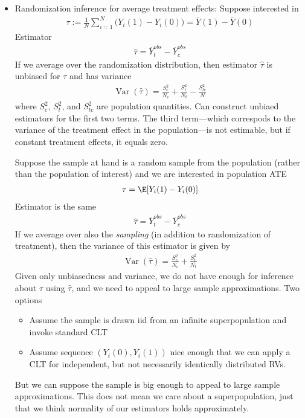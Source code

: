 \documentclass[12pt]{article}
\theoremstyle{plain}
\theoremstyle{definition}
\theoremstyle{remark}
\newcommand{\Var}{\operatorname{Var}}
\newcommand{\sumiN}{\sum^N_{i=1}}
\begin{document}
\begin{itemize}
  \item
    Randomization inference for average treatment effects:
    Suppose interested in
    \begin{align*}
      \tau
      :=
      \frac{1}{N}
      \sumiN
      \big(
      Y_i(1)-Y_i(0)
      \big)
      =
      \overline{Y}(1)
      -
      \overline{Y}(0)
    \end{align*}
    Estimator
    \begin{align*}
      \hat{\tau}
      =
      \overline{Y}_t^{obs}
      -
      \overline{Y}_c^{obs}
    \end{align*}
    If we average over the randomization distribution,
    then estimator $\hat{\tau}$ is unbiased for $\tau$ and has variance
    \begin{align*}
      \Var(\hat{\tau})
      =
      \frac{S^2_c}{N_c}
      +
      \frac{S^2_t}{N_t}
      -
      \frac{S^2_{tc}}{N}
    \end{align*}
    where $S^2_c$, $S^2_t$, and $S^2_{tc}$ are population quantities.
    Can construct unbiaed estimators for the first two terms.
    The third term---which correspods to the variance of the treatment
    effect in the population---is not estimable, but if constant
    treatment effects, it equals zero.

    Suppose the sample at hand is a random sample from the population
    (rather than the population of interest) and we are interested in
    population ATE
    \begin{align*}
      \tau = \E[Y_i(1)-Y_i(0)]
    \end{align*}
    Estimator is the same
    \begin{align*}
      \hat{\tau}
      =
      \overline{Y}_t^{obs}
      -
      \overline{Y}_c^{obs}
    \end{align*}
    If we average over also the \emph{sampling} (in addition to
    randomization of treatment), then the variance of this estimator is
    given by
    \begin{align*}
      \Var(\hat{\tau})
      =
      \frac{S^2_c}{N_c}
      +
      \frac{S^2_t}{N_t}
    \end{align*}
    Given only unbiasedness and variance, we do not have enough for
    inference about $\tau$ using $\hat{\tau}$, and we need to appeal to
    large sample approximations.
    Two options
    \begin{itemize}
      \item Assume the sample is drawn iid from an infinite
        superpopulation and invoke standard CLT
      \item Assume sequence $(Y_i(0),Y_i(1))$ nice enough that we can
        apply a CLT for independent, but not necessarily identically
        distributed RVs.
    \end{itemize}
    But we can suppose the sample is big enough to appeal to
    large sample approximations. This does not mean we care about a
    superpopulation, just that we think normality of our estimators
    holds approximately.




\end{itemize}
\end{document}
